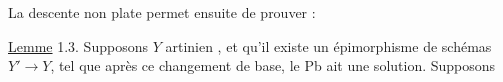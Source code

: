La descente non plate  permet ensuite de prouver :

\uline{Lemme} 1.3. Supposons $Y$ artinien ,  et qu'il existe un
épimorphisme  de schémas $Y'\to Y$, tel que après ce
changement de base, le Pb ait une solution. Supposons
